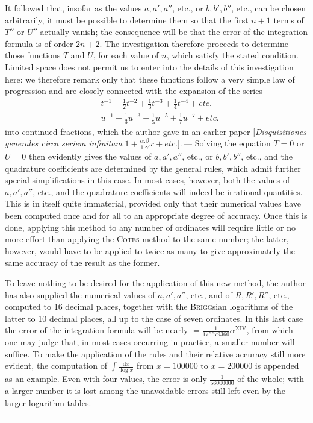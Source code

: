 It followed that, insofar as the values \(a,a',a''\), etc., or \(b,b',b''\), etc., can be chosen arbitrarily, it must be possible to determine them so that the first \(n+1\) terms of \(T''\) or \(U''\) actually vanish; the consequence will be that the error of the integration formula is of order \(2n+2\). The investigation therefore proceeds to determine those functions \(T\) and \(U\), for each value of \(n\), which satisfy the stated condition. Limited space does not permit
us to enter into the details of this investigation here: we therefore remark only that these functions follow a very simple law of progression and are closely connected with the expansion of the series
\[
\begin{aligned}
&t^{-1}+\tfrac{1}{2}t^{-2}+\tfrac{1}{3}t^{-3}+\tfrac{1}{4}t^{-4}+\mathit{etc.}\\
&u^{-1}+\tfrac{1}{3}u^{-3}+\tfrac{1}{5}u^{-5}+\tfrac{1}{7}u^{-7}+\mathit{etc.}
\end{aligned}
\]
into continued fractions, which the author gave in an earlier paper [\textit{Disquisitiones generales circa seriem infinitam}
\(1+\frac{\alpha.\beta}{1.\gamma}x+\mathit{etc.}\)].\,---
Solving the equation \(T=0\) or \(U=0\) then evidently gives the values of \(a,a',a''\), etc., or \(b,b',b''\), etc., and the quadrature coefficients are determined by the general rules, which admit further special simplifications in this case. In most cases, however, both the values of \(a,a',a''\), etc., and the quadrature coefficients will indeed be irrational quantities. This is in itself quite immaterial, provided only that their numerical values have been computed once and for all to an appropriate degree of accuracy. Once this is done, applying this method to any number of ordinates will require little or no more effort than applying the \textsc{Cotes} method to the same number; the latter, however, would have to be applied to twice as many to give approximately the same accuracy of the result as the former.

To leave nothing to be desired for the application of this new method, the author has also supplied the numerical values of \(a,a',a''\), etc., and of \(R,R',R''\), etc., computed to 16 decimal places, together with the \textsc{Brigg}sian logarithms of the latter to 10 decimal places, all up to the case of seven ordinates. In this last case the error of the integration formula will be nearly \(=\frac{1}{176679360}\alpha^{\mathrm{XIV}}\), from which one may judge that, in most cases occurring in practice, a smaller number will suffice. To make the application of the rules and their relative accuracy still more evident, the computation of \(\int\frac{\mathrm{d}x}{\log x}\) from \(x=100000\) to \(x=200000\) is appended as an example. Even with four values, the error is only \(\frac{1}{56000000}\) of the whole; with a larger number it is lost among the unavoidable errors still left even by the larger logarithm tables.
\par\begin{center}\rule{0.22\linewidth}{0.3pt}\end{center}
